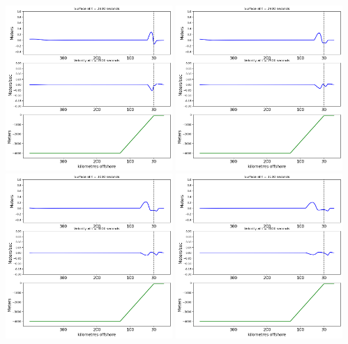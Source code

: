 \documentclass[11pt]{article}
\begin{document}
\vskip 10pt 
\includegraphics[width=0.475\textwidth]{frame0028fig2.png}
\vskip 10pt 
\includegraphics[width=0.475\textwidth]{frame0029fig2.png}
\vskip 10pt 
\includegraphics[width=0.475\textwidth]{frame0030fig2.png}
\vskip 10pt 
\includegraphics[width=0.475\textwidth]{frame0031fig2.png}
\end{document}
